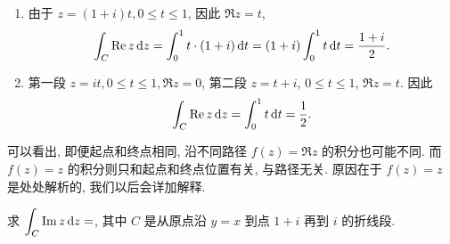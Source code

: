 \begin{solution}
	\begin{enumerate}
		\item 由于 $z=(1+i)t,0\le t\le 1$, 因此 $\Re z=t$,
		\[
			\int_C\operatorname{Re} z\,\mathrm{d} z=\int_0^1t\cdot(1+i)\,\mathrm{d} t
			=(1+i)\int_0^1t\,\mathrm{d} t
			=\frac{1+i}2.
		\]
		\item 第一段 $z=it,0\le t\le 1, \Re z=0$,
		第二段 $z=t+i$, $0\le t\le 1$, $\Re z=t$. 因此
		\[\int_C\operatorname{Re} z\,\mathrm{d} z=\int_0^1 t\,\mathrm{d} t=\frac12.\]
	\end{enumerate}
\end{solution}

可以看出, 即便起点和终点相同, 沿不同路径 $f(z)=\Re z$ 的积分也可能不同.
而 $f(z)=z$ 的积分则只和起点和终点位置有关, 与路径无关.
原因在于 $f(z)=z$ 是处处解析的, 我们以后会详加解释.

\begin{exercise}
	求 $\displaystyle\int_C\operatorname{Im} z\,\mathrm{d} z=$\fillblank[3cm][2mm]{}, 其中 $C$ 是从原点沿 $y=x$ 到点 $1+i$ 再到 $i$ 的折线段.
\end{exercise}

